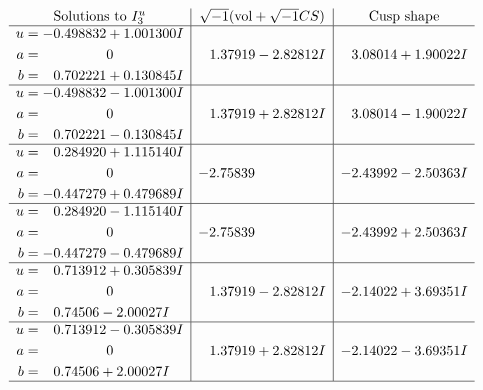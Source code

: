 \documentclass[1p]{elsarticle_modified}
\theoremstyle{definition}
\newcommand{\I}{\sqrt{-1}}
\begin{document}
$$\begin{array}{c|c|c}  
\text{Solutions to }I^u_{3}& \I (\text{vol} + \sqrt{-1}CS) & \text{Cusp shape}\\
 \hline 
\begin{aligned}
u &= -0.498832 + 1.001300 I \\
a &= \phantom{-0.000000 } 0 \\
b &= \phantom{-}0.702221 + 0.130845 I\end{aligned}
 & \phantom{-}1.37919 - 2.82812 I & \phantom{-}3.08014 + 1.90022 I \\ \hline\begin{aligned}
u &= -0.498832 - 1.001300 I \\
a &= \phantom{-0.000000 } 0 \\
b &= \phantom{-}0.702221 - 0.130845 I\end{aligned}
 & \phantom{-}1.37919 + 2.82812 I & \phantom{-}3.08014 - 1.90022 I \\ \hline\begin{aligned}
u &= \phantom{-}0.284920 + 1.115140 I \\
a &= \phantom{-0.000000 } 0 \\
b &= -0.447279 + 0.479689 I\end{aligned}
 & -2.75839\phantom{ +0.000000I} & -2.43992 - 2.50363 I \\ \hline\begin{aligned}
u &= \phantom{-}0.284920 - 1.115140 I \\
a &= \phantom{-0.000000 } 0 \\
b &= -0.447279 - 0.479689 I\end{aligned}
 & -2.75839\phantom{ +0.000000I} & -2.43992 + 2.50363 I \\ \hline\begin{aligned}
u &= \phantom{-}0.713912 + 0.305839 I \\
a &= \phantom{-0.000000 } 0 \\
b &= \phantom{-}0.74506 - 2.00027 I\end{aligned}
 & \phantom{-}1.37919 - 2.82812 I & -2.14022 + 3.69351 I \\ \hline\begin{aligned}
u &= \phantom{-}0.713912 - 0.305839 I \\
a &= \phantom{-0.000000 } 0 \\
b &= \phantom{-}0.74506 + 2.00027 I\end{aligned}
 & \phantom{-}1.37919 + 2.82812 I & -2.14022 - 3.69351 I\\
 \hline 
 \end{array}$$\newpage
\end{document}
